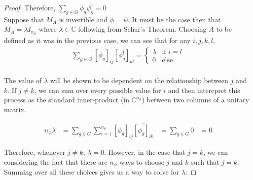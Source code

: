 \documentclass[10pt]{ucthesis}
\newcommand{\C}{\mathbb{C}}
\begin{document}
\begin{proof}
Therefore, $\sum_{g\in G}\phi_{g}\psi_g^{\dag}=0$ \\

Suppose that $M_A$ is invertible and $\phi=\psi$. It must be the case then that $M_A = \lambda I_{n_\phi}$ where $\lambda \in \C$ following from Schur's Theorem. Choosing $A$ to be defined as it was in the previous case, we can see that for any $i,j,k,l,$
\begin{equation}
	\begin{aligned}
		\sum_{g\in G} \left[\phi_g\right]_{ij}\left[\phi^\dag_g\right]_{kl} = \begin{cases}
																			\lambda &\text{if } i = l\\
																			0 & \text{else}
																			\end{cases}\\
	\end{aligned}
\end{equation}

The value of $\lambda$ will be shown to be dependent on the relationship between $j$ and $k$. If $j\neq k$, we can sum over every possible value for $i$ and then interepret this process as the standard inner-product (in $\C^{n_\phi}$) between two columns of a unitary matrix.

\begin{equation}
	\begin{aligned}
		n_\phi \lambda &= \sum_{g\in G} \sum_{i=1}^{n_\phi}\left[\phi_g\right]_{ij}\overline{\left[\phi_g\right]_{ik}} &= \sum_{g\in G} 0 &= 0
	\end{aligned}
\end{equation}


Therefore, whenever $j\neq k$, $\lambda = 0$. However, in the case that $j=k$, we can considering the fact that there are $n_\phi$ ways to choose $j$ and $k$ such that $j=k$. Summing over all these choices gives us a way to solve for $\lambda$:


\end{proof}
\end{document}
